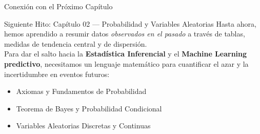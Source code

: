 \documentclass[10pt,aspectratio=169]{beamer}
\begin{document}
\begin{frame}{Conexión con el Próximo Capítulo}
  \begin{alertblock}{Siguiente Hito: Capítulo 02 — Probabilidad y Variables Aleatorias}
    Hasta ahora, hemos aprendido a resumir datos \emph{observados en el pasado} a través de tablas, medidas de tendencia central y de dispersión.
    \vspace{0.6em}
    \\ Para dar el salto hacia la \textbf{Estadística Inferencial} y el \textbf{Machine Learning predictivo}, necesitamos un lenguaje matemático para cuantificar el azar y la incertidumbre en eventos futuros:
    \begin{itemize}
      \item Axiomas y Fundamentos de Probabilidad
      \item Teorema de Bayes y Probabilidad Condicional
      \item Variables Aleatorias Discretas y Continuas
    \end{itemize}
  \end{alertblock}
\end{frame}
\end{document}
